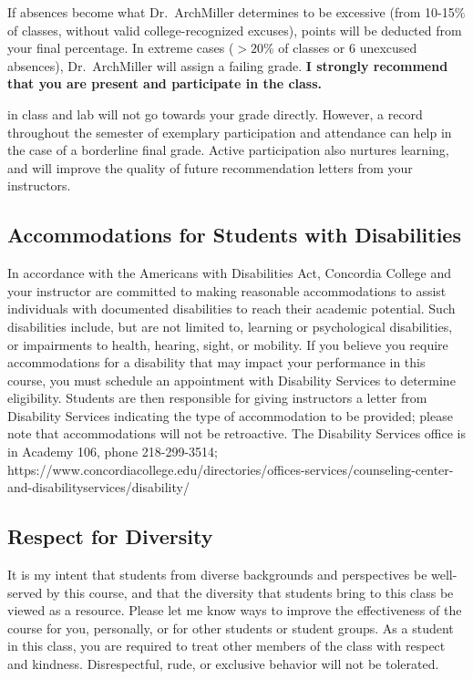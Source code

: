 \documentclass{tufte-handout}
\begin{document}
\begin{fullwidth}
If absences become what Dr.~ArchMiller determines to be excessive (from 10-15\% of classes, without valid college-recognized excuses), points will be deducted from your final percentage. In extreme cases ($>20$\% of classes or 6 unexcused absences), Dr.~ArchMiller will assign a failing grade. \textbf{I strongly recommend that you are present and participate in the class.}

 in class and lab will not go towards your grade directly. However, a record throughout the semester of exemplary participation and attendance can help in the case of a borderline final grade. Active participation also nurtures learning, and will improve the quality of future recommendation letters from your instructors.  

\subsection{Accommodations for Students with Disabilities}

In accordance with the Americans with Disabilities Act, Concordia College and your instructor are committed to making reasonable accommodations to assist individuals with documented disabilities to reach their academic potential. Such disabilities include, but are not limited to, learning or psychological disabilities, or impairments to health, hearing, sight, or mobility. If you believe you require accommodations for a disability that may impact your performance in this course, you must schedule an appointment with Disability Services to determine eligibility. Students are then responsible for giving instructors a letter from Disability Services indicating the type of accommodation to be provided; please note that accommodations will not be retroactive. The Disability Services office is in Academy 106, phone 218-299-3514; https://www.concordiacollege.edu/directories/offices-services/counseling-center-and-disabilityservices/disability/ 

\subsection{Respect for Diversity}

It is my intent that students from diverse backgrounds and perspectives be well-served by this course, and that the diversity that students bring to this class be viewed as a resource. Please let me know ways to improve the effectiveness of the course for you, personally, or for other students or student groups. As a student in this class, you are required to treat other members of the class with respect and kindness. Disrespectful, rude, or exclusive behavior will not be tolerated.


\end{fullwidth}
\end{document}
